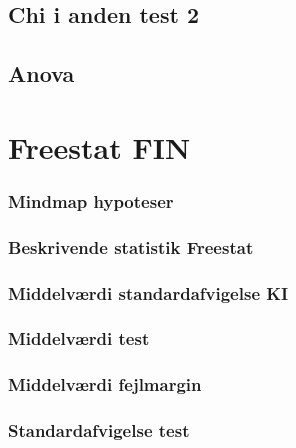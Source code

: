 \documentclass[]{book}
\begin{document}
\hypertarget{chi-i-anden-test-2}{%
\subsection{Chi i anden test 2}\label{chi-i-anden-test-2}}

\hypertarget{anova}{%
\subsection{Anova}\label{anova}}

\hypertarget{freestat-fin}{%
\section{Freestat FIN}\label{freestat-fin}}

\hypertarget{mindmap-hypoteser}{%
\subsubsection{Mindmap hypoteser}\label{mindmap-hypoteser}}

\hypertarget{beskrivende-statistik-freestat}{%
\subsubsection{Beskrivende statistik
Freestat}\label{beskrivende-statistik-freestat}}

\hypertarget{middelvrdi-standardafvigelse-ki}{%
\subsubsection{Middelværdi standardafvigelse
KI}\label{middelvrdi-standardafvigelse-ki}}

\hypertarget{middelvrdi-test}{%
\subsubsection{Middelværdi test}\label{middelvrdi-test}}

\hypertarget{middelvrdi-fejlmargin}{%
\subsubsection{Middelværdi fejlmargin}\label{middelvrdi-fejlmargin}}

\hypertarget{standardafvigelse-test}{%
\subsubsection{Standardafvigelse test}\label{standardafvigelse-test}}
\end{document}
